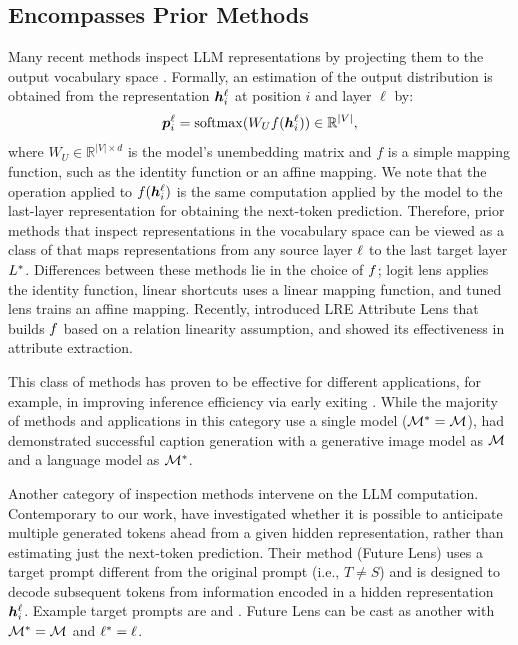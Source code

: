 \documentclass{article}
\theoremstyle{plain}
\theoremstyle{definition}
\theoremstyle{remark}
\begin{document}
\subsection{\methodFamilyName{} Encompasses Prior Methods}
\label{sec:encompass_prior_methods}

Many recent methods inspect LLM representations by projecting them to the output vocabulary space \cite{logitlens,din2023jump,belrose2023eliciting}. 
Formally, an estimation of the output distribution is obtained from the representation ${\bm{h}}_i^\ell$ at position $i$ and layer $\ell$ by:
$${\bm{p}}_i^\ell = \mathrm{softmax}(W_Uf({\bm{h}}_i^\ell)) \in \mathbb{R}^{|V|} ,$$ 
where $W_U \in \mathbb{R}^{|V|\times d}$ is the model's unembedding matrix and $f$ is a simple mapping function, such as the identity function or an affine mapping. We note that the operation applied to $f({\bm{h}}_i^\ell)$ is the same computation applied by the model to the last-layer representation for obtaining the next-token prediction. Therefore, prior methods that inspect representations in the vocabulary space can be viewed as a class of \methodFamilyName{} that maps representations from any source layer $\ell$ to the last target layer $L^*$. Differences between these methods lie in the choice of $f$; logit lens \cite{logitlens, dar2023analyzing} applies the identity function, linear shortcuts \cite{din2023jump} uses a linear mapping function, and tuned lens \cite{belrose2023eliciting} trains an affine mapping. Recently, \citet{hernandez2023linearity} introduced LRE Attribute Lens that builds $f$ based on a relation linearity assumption, and showed its effectiveness in attribute extraction.

This class of methods has proven to be effective for different applications, for example, in improving inference efficiency via early exiting \cite{din2023jump}. While the majority of methods and applications in this category use a single model ($\mathcal{M}^* = \mathcal{M}$), \citet{merullo2022linearly} had demonstrated successful caption generation with a generative image model as $\mathcal{M}$ and a language model as $\mathcal{M}^*$. 

Another category of inspection methods intervene on the LLM computation. Contemporary to our work, \citet{pal2023future} have investigated whether it is possible to anticipate multiple generated tokens ahead from a given hidden representation, rather than estimating just the next-token prediction. Their method (Future Lens) uses a target prompt different from the original prompt (i.e., $T \neq S$) and is designed to decode subsequent tokens from information encoded in a hidden representation ${\bm{h}}_i^\ell$. Example target prompts are  and .
Future Lens can be cast as another \methodName{} with $\mathcal{M}^* = \mathcal{M}$ and $\ell^* = \ell$.
\end{document}
